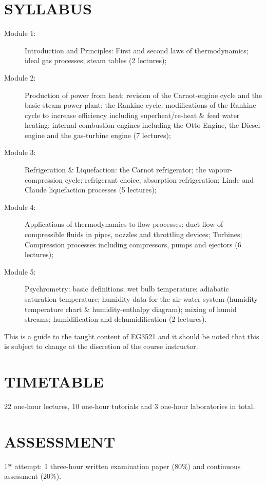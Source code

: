 \documentclass[12pts,a4paper,amsmath,amssymb,floatfix]{article}%
\begin{document}
\section{SYLLABUS}
\begin{description}
   \item[Module 1:] Introduction and Principles: First and second laws of thermodynamics; ideal gas processes; steam tables (2 lectures);
   \item[Module 2:] Production of power from heat: revision of the Carnot-engine cycle and the basic steam power plant; the Rankine cycle; modifications of the Rankine cycle to increase efficiency including superheat/re-heat $\&$ feed water heating; internal combustion engines including the Otto Engine, the Diesel engine and the gas-turbine engine (7 lectures);
   \item[Module 3:] Refrigeration $\&$ Liquefaction: the Carnot refrigerator; the vapour-compression cycle; refrigerant choice; absorption refrigeration; Linde and Claude liquefaction processes (5 lectures);
   \item[Module 4:] Applications of thermodynamics to flow processes: duct flow of compressible fluids in pipes, nozzles and throttling devices; Turbines; Compression processes including compressors, pumps and ejectors (6 lectures);
   \item[Module 5:] Psychrometry: basic definitions; wet bulb temperature; adiabatic saturation temperature; humidity data for the air-water system (humidity-temperature chart $\&$ humidity-enthalpy diagram); mixing of humid streams; humidification and dehumidification (2 lectures).
\end{description}

\medskip
This is a guide to the taught content of EG3521 and it should be noted that this is subject to change at the discretion of the course instructor.


\section{TIMETABLE}
22 one-hour lectures, 10 one-hour tutorials and 3 one-hour laboratories in total. %


\section{ASSESSMENT}
1$^{st}$ attempt: 1 three-hour written examination paper (80$\%$) and continuous assessment (20$\%$). 
\medskip
\end{document}
